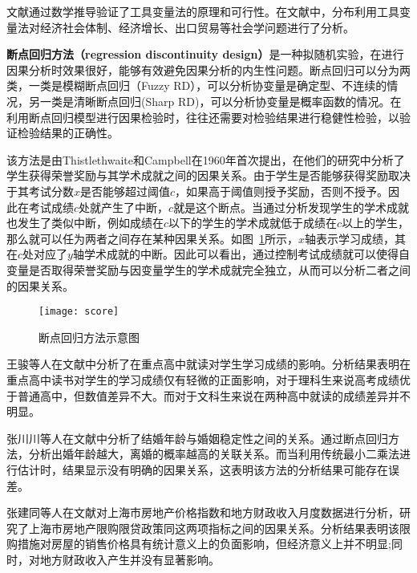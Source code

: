 文献\cite{arellano1995another, nelson1988some, cragg1993testing}通过数学推导验证了工具变量法的原理和可行性。在文献\cite{陈林2012中国地区性行政垄断与区域经济绩效, 方颖2011寻找制度的工具变量, 陈昊2014出口贸易与学历误配}中，分布利用工具变量法对经济社会体制、经济增长、出口贸易等社会学问题进行了分析。

\textbf{断点回归方法（regression discontinuity design）}是一种拟随机实验，在进行因果分析时效果很好，能够有效避免因果分析的内生性问题\cite{余静文2011新}。断点回归可以分为两类，一类是模糊断点回归（Fuzzy RD），可以分析协变量是确定型、不连续的情况，另一类是清晰断点回归(Sharp RD)，可以分析协变量是概率函数的情况\cite{imbens2008regression}。在利用断点回归模型进行因果检验时，往往还需要对检验结果进行稳健性检验，以验证检验结果的正确性。

该方法是由Thistlethwaite和Campbell在1960年首次提出\cite{thistlethwaite1960regression}，在他们的研究中分析了学生获得荣誉奖励与其学术成就之间的因果关系。由于学生是否能够获得奖励取决于其考试分数$x$是否能够超过阈值$c$，如果高于阈值则授予奖励，否则不授予。因此在考试成绩$c$处就产生了中断，$c$就是这个断点。当通过分析发现学生的学术成就也发生了类似中断，例如成绩在$c$以下的学生的学术成就低于成绩在$c$以上的学生，那么就可以任为两者之间存在某种因果关系。如图~\ref{score}所示，$x$轴表示学习成绩，其在$c$处对应了$y$轴学术成就的中断。因此可以看出，通过控制考试成绩就可以使得自变量是否取得荣誉奖励与因变量学生的学术成就完全独立，从而可以分析二者之间的因果关系。

\begin{figure}[h] 
  \centering
  \texttt{[image: score]}
  \caption{断点回归方法示意图\cite{lee2010regression}}
  \label{score}
\end{figure}

王骏等人在文献\cite{王骏2015重点高中能否提高学生的学业成绩}中分析了在重点高中就读对学生学习成绩的影响。分析结果表明在重点高中读书对学生的学习成绩仅有轻微的正面影响，对于理科生来说高考成绩优于普通高中，但数值差异不大。而对于文科生来说在两种高中就读的成绩差异并不明显。

张川川等人在文献\cite{zhang2012结婚年龄与婚姻的稳定性}中分析了结婚年龄与婚姻稳定性之间的关系。通过断点回归方法，分析出婚年龄越大，离婚的概率越高的关联关系。而当利用传统最小二乘法进行估计时，结果显示没有明确的因果关系，这表明该方法的分析结果可能存在误差。

张建同等人在文献\cite{张建同2015上海市房地产限购限贷政策评估}对上海市房地产价格指数和地方财政收入月度数据进行分析，研究了上海市房地产限购限贷政策同这两项指标之间的因果关系。分析结果表明该限购措施对房屋的销售价格具有统计意义上的负面影响，但经济意义上并不明显;同时，对地方财政收入产生并没有显著影响。

